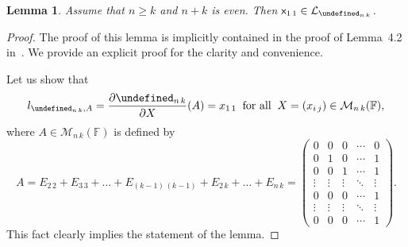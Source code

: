 \documentclass{elsarticle}
\let\det\undefined
\DeclareMathOperator{\det}{det}
\def\F{{\mathbb F}}
\def\M{{\mathcal M}}
\newtheorem{lemma}[theorem]{Lemma}
\theoremstyle{definition}
\numberwithin{equation}{section}
\begin{document}
\begin{lemma}\label{lem:NKEven11InL}Assume that  $n \ge k$ and  $n + k$ is even. Then $\mathsf x_{1\,1} \in \mathcal L_{\det_{n\,k}}$.
\end{lemma}

\begin{proof}The proof of this lemma is implicitly contained in the proof of Lemma~4.2 in~\cite{Guterman2025}. We provide an explicit proof for the clarity and convenience. 

Let us show that
\begin{equation}\label{lem:NKEven11InL:eq5}
l_{\det_{n\,k}, A} = \frac{\partial \det_{n\,k}}{\partial X}(A) = x_{1\,1}\;\;\mbox{for all}\;\; X = (x_{i\,j}) \in \M_{n\,k}(\F),
\end{equation}
where $A \in \M_{n\,k}(\F)$ is defined by
\[
A = E_{2\,2} + E_{3\,3} + \ldots + E_{(k-1)\,(k-1)} + E_{2\,k} + \ldots + E_{n\,k}  = \begin{pmatrix}
0 & 0 & 0 & \cdots & 0\\
0 & 1 & 0 &\cdots & 1\\
0 & 0 & 1 &\cdots & 1\\
\vdots & \vdots & \vdots & \ddots & \vdots\\
0 & 0 & 0 & \cdots & 1\\
\vdots & \vdots & \vdots & \ddots & \vdots\\
0 & 0 & 0 & \cdots & 1
\end{pmatrix}.
\]
This fact clearly implies the statement of the lemma.


\end{proof}
\end{document}
